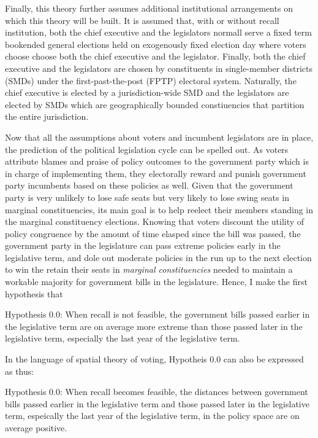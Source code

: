 \documentclass[hyphens, crop=false]{standalone}
\begin{document}
	
	
	
	
	
	Finally,
	this theory further assumes additional institutional arrangements
	on which this theory will be built.
	It is assumed that,
	with or without recall institution,
	both the chief executive and the legislators normall serve a fixed term
	bookended general elections held on exogenously fixed election day
	where voters choose choose both the chief executive and the legislator.
	Finally, both the chief executive and the legislators are chosen
	by constituents in single-member districts (SMDs) under
	the first-past-the-post (FPTP) electoral system.
	Naturally, the chief executive is elected by a jurisdiction-wide SMD
	and the legislators are elected by SMDs
	which are geographically bounded constiuencies that partition the entire jurisdiction.
	

	Now that all the assumptions about voters and incumbent legislators
	are in place,
	the prediction of the political legislation cycle can be spelled out.
	As voters attribute blames and praise of policy outcomes
	to the government party which is
	in charge of implementing them,
	they electorally reward and punish government party incumbents
	based on these policies as well.
	Given that the government party is very unlikely to lose safe seats
	but very likely to lose swing seats in marginal constituencies,
	its main goal is to help reelect their members
	standing in the marginal constituency elections.
	Knowing
	that voters discount the utility of policy congruence
	by the amount of time elasped since the bill was passed,
	the government party in the legislature
	can pass extreme policies early in the legislative term,
	and dole out moderate policies in the run up to the next election
	to win the retain their seats in \textit{marginal constituencies}
	needed to maintain a workable majority for government bills
	in the legislature.
	Hence,
	I make the first hypothesis that
	
	Hypothesis 0.0: When recall is not feasible,
	the government bills passed earlier in the legislative term are on average  
	more extreme than those passed later in the legislative term,
	especially the last year of the legislative term.
	
	In the language of spatial theory of voting,
	Hypotheis 0.0 can also be expressed as thus:
	
	Hypothesis 0.0: When recall becomes feasible,
	the distances between government bills passed earlier in the legislative term
	and those passed later in the legislative term,
	espeically the last year of the legislative term,
	in the policy space are on average positive.
	
\end{document}

